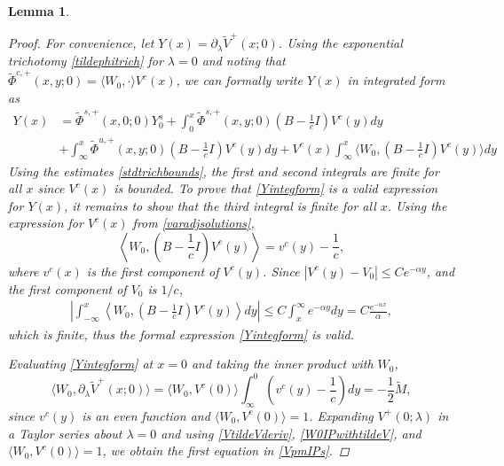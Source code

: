 \documentclass[12pt]{elsarticle}
\theoremstyle{plain}
\newtheorem{lemma}[theorem]{Lemma}
\theoremstyle{definition}
\theoremstyle{remark}
\numberwithin{theorem}{section}
\numberwithin{equation}{section}
\begin{document}
\begin{lemma}
\begin{proof}
For convenience, let $Y(x) = \partial_\lambda \tilde{V}^+(x; 0)$. Using the exponential trichotomy \cref{tildephitrich} for $\lambda = 0$ and noting that $\tilde{\Phi}^{c,+}(x, y; 0) = \langle W_0, \cdot \rangle V^c(x)$, we can formally write $Y(x)$ in integrated form as
\begin{equation}\label{Yintegform}
\begin{aligned}
Y(x) &= \tilde{\Phi}^{s,+}(x,0; 0)Y_0^s 
+ \int_0^x \tilde{\Phi}^{s,+}(x,y; 0)\left( B - \frac{1}{c}I \right) V^c(y) dy \\
&+ \int_{\infty}^x \tilde{\Phi}^{u,+}(x,y; 0)\left( B - \frac{1}{c}I \right) V^c(y) dy + V^c(x) \int_{\infty}^x \langle W_0, \left( B - \frac{1}{c}I \right) V^c(y) \rangle dy 
\end{aligned}
\end{equation}
Using the estimates \cref{stdtrichbounds}, the first and second integrals are finite for all $x$ since $V^c(x)$ is bounded. To prove that \cref{Yintegform} is a valid expression for $Y(x)$, it remains to show that the third integral is finite for all $x$. Using the expression for $V^c(x)$ from \cref{varadjsolutions}, 
\[
\left\langle W_0, \left( B - \frac{1}{c}I \right) V^c(y) \right\rangle = v^c(y) - \frac{1}{c},
\]
where $v^c(x)$ is the first component of $V^c(y)$. Since $|V^c(y) - V_0|\leq C e^{-\alpha y}$, and the first component of $V_0$ is $1/c$, 
\begin{align*}
\left| \int_{-\infty}^x \left\langle W_0, \left( B - \frac{1}{c}I \right) V^c(y) \right\rangle dy \right| 
\leq C \int_x^{\infty} e^{-\alpha y} dy = C \frac{e^{-\alpha x}}{\alpha},
\end{align*}
which is finite, thus the formal expression \cref{Yintegform} is valid. 

Evaluating \cref{Yintegform} at $x = 0$ and taking the inner product with $W_0$, 
\begin{equation}\label{W0IPwithtildeV}
\langle W_0, \partial_\lambda \tilde{V}^+(x; 0) \rangle
= \langle W_0, V^c(0) \rangle \int_{\infty}^0 \left(v^c(y) - \frac{1}{c}\right) dy = -\frac{1}{2} \tilde{M},
\end{equation}
since $v^c(y)$ is an even function and $\langle W_0, V^c(0) \rangle = 1$. Expanding $V^+(0; \lambda)$ in a Taylor series about $\lambda = 0$ and using \cref{VtildeVderiv}, \cref{W0IPwithtildeV}, and $\langle W_0, V^c(0)\rangle = 1$, we obtain the first equation in \cref{VpmIPs}.


\end{proof}
\end{lemma}
\end{document}
